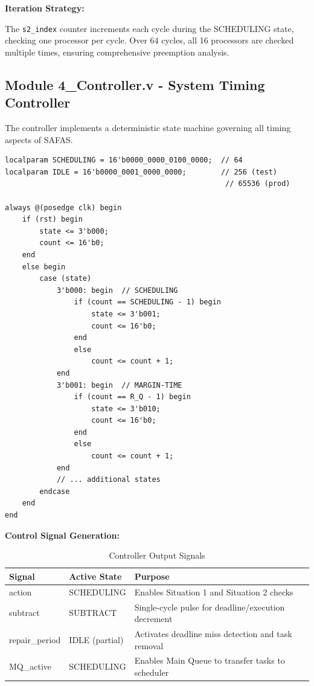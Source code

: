 \documentclass[12pt,a4paper]{article}
\begin{document}
\textbf{Iteration Strategy:}

The \texttt{s2\_index} counter increments each cycle during the SCHEDULING state, checking one processor per cycle. Over 64 cycles, all 16 processors are checked multiple times, ensuring comprehensive preemption analysis.

\subsection{Module 4\_Controller.v - System Timing Controller}

The controller implements a deterministic state machine governing all timing aspects of SAFAS.

\begin{lstlisting}[style=verilog, caption={Controller State Machine}]
localparam SCHEDULING = 16'b0000_0000_0100_0000;  // 64
localparam IDLE = 16'b0000_0001_0000_0000;        // 256 (test)
                                                   // 65536 (prod)

always @(posedge clk) begin
    if (rst) begin
        state <= 3'b000;
        count <= 16'b0;
    end
    else begin
        case (state)
            3'b000: begin  // SCHEDULING
                if (count == SCHEDULING - 1) begin
                    state <= 3'b001;
                    count <= 16'b0;
                end
                else
                    count <= count + 1;
            end
            3'b001: begin  // MARGIN-TIME
                if (count == R_Q - 1) begin
                    state <= 3'b010;
                    count <= 16'b0;
                end
                else
                    count <= count + 1;
            end
            // ... additional states
        endcase
    end
end
\end{lstlisting}

\textbf{Control Signal Generation:}

\begin{table}[H]
\centering
\begin{tabular}{|l|l|p{6cm}|}
\hline
\textbf{Signal} & \textbf{Active State} & \textbf{Purpose} \\
\hline
action & SCHEDULING & Enables Situation 1 and Situation 2 checks \\
subtract & SUBTRACT & Single-cycle pulse for deadline/execution decrement \\
repair\_period & IDLE (partial) & Activates deadline miss detection and task removal \\
MQ\_active & SCHEDULING & Enables Main Queue to transfer tasks to scheduler \\
\hline
\end{tabular}
\caption{Controller Output Signals}
\end{table}
\end{document}
